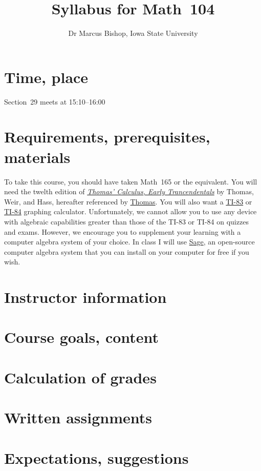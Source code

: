 \documentclass[11pt]{article}
\title{Syllabus for Math~104}
\author{Dr Marcus Bishop, Iowa State University}
\begin{document}
\maketitle

\section{Time, place}\label{Time} Section~29 meets at 15:10--16:00

\section{Requirements, prerequisites, materials}\label{Require}
To take this course, you should have taken Math~165
or the equivalent. You will need the twelth edition of 
\href{http://wps.aw.com/aw_thomas_calculus_series}
{\em Thomas' Calculus, Early Trancendentals}
by Thomas, Weir, and Hass, hereafter referenced by
\href{http://wps.aw.com/aw_thomas_calculus_series}{Thomas}.
You will also want a 
\href{http://en.wikipedia.org/wiki/TI-83}{TI-83} or
\href{http://en.wikipedia.org/wiki/TI-84}{TI-84}
graphing calculator. Unfortunately, we cannot allow you to use
any device with algebraic capabilities greater than those of the TI-83
or TI-84 on quizzes and exams. However, we encourage
you to supplement your learning with a computer algebra system
of your choice.
In class I will use \href{http://www.sagemath.org}{\textsf Sage},
an open-source computer algebra system that you can install on your
computer for free if you wish.

\section{Instructor information}
\section{Course goals, content}
\section{Calculation of grades}\label{Assessment}
\section{Written assignments}\label{Written}
\section{Expectations, suggestions}
\end{document}
